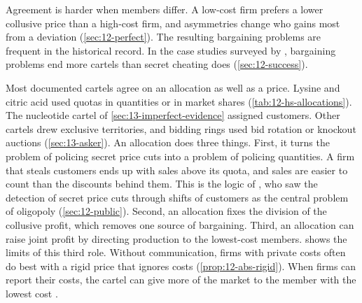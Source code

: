 Agreement is harder when members differ. A low-cost
firm prefers a lower collusive price than a high-cost firm, and asymmetries change who gains most from a deviation
(\cref{sec:12-perfect}). The resulting bargaining problems are frequent in the historical record.
In the case studies surveyed by \citet{LevensteinSuslow2006}, bargaining problems end more cartels than secret
cheating does (\cref{sec:12-success}).

Most documented cartels agree on an allocation as well as a price. Lysine and citric acid used quotas in
quantities or in market shares (\cref{tab:12-hs-allocations}). The nucleotide cartel of
\cref{sec:13-imperfect-evidence} assigned customers. Other cartels drew exclusive territories, and bidding rings
used bid rotation or knockout auctions (\cref{sec:13-asker}). An allocation does three things. First, it turns the
problem of policing secret price cuts into a problem of policing quantities. A firm that steals customers ends up
with sales above its quota, and sales are easier to count than the discounts behind them. This is the logic of
\citet{Stigler1964}, who saw the detection of secret price cuts through shifts of customers as the central
problem of oligopoly (\cref{sec:12-public}). Second, an allocation fixes the division of the collusive profit,
which removes one source of bargaining. Third, an allocation can raise joint profit by directing production to the
lowest-cost members.  shows the limits of this third role. Without communication, firms
with private costs often do best with a rigid price that ignores costs (\cref{prop:12-abs-rigid}). When firms can
report their costs, the cartel can give more of the market to the member with the lowest cost
\citep{AtheyBagwell2001}.


